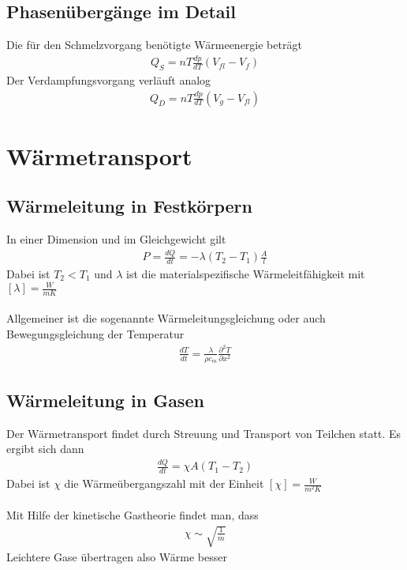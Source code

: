 \documentclass[a4paper,12pt]{report}
\begin{document}
\subsection{Phasenübergänge im Detail}
Die für den Schmelzvorgang benötigte Wärmeenergie beträgt 
\begin{align}
Q_S = nT\frac{dp}{dT}(V_{fl} - V_f)
\end{align}
Der Verdampfungsvorgang verläuft analog 
\begin{align}
Q_D = nT\frac{dp}{dT}(V_{g} - V_{fl})
\end{align}

\section{Wärmetransport}


\subsection{Wärmeleitung in Festkörpern}
In einer Dimension und im Gleichgewicht gilt 
\begin{align}
P = \frac{dQ}{dt} = - \lambda (T_2-T_1)\frac{A}{l}
\end{align}
Dabei ist $T_2 < T_1$ und $\lambda$ ist die materialspezifische Wärmeleitfähigkeit mit $[\lambda] = \frac{W}{mK}$ \\
\\
Allgemeiner ist die sogenannte Wärmeleitungsgleichung oder auch Bewegungsgleichung der Temperatur
\begin{align}
\frac{dT}{dt} = \frac{\lambda}{\rho c_m}\frac{\partial^2 T}{\partial x^2}
\end{align}

\subsection{Wärmeleitung in Gasen}
Der Wärmetransport findet durch Streuung und Transport von Teilchen statt. Es ergibt sich dann
\begin{align}
\frac{dQ}{dt} = \chi A(T_1-T_2)
\end{align}
Dabei ist $\chi$ die Wärmeübergangszahl mit der Einheit $[\chi] = \frac{W}{m^2K}$ \\
\\
Mit Hilfe der kinetische Gastheorie findet man, dass 
\begin{align}
\chi \sim \sqrt{\frac{1}{m}}
\end{align}
Leichtere Gase übertragen also Wärme besser 
\end{document}
